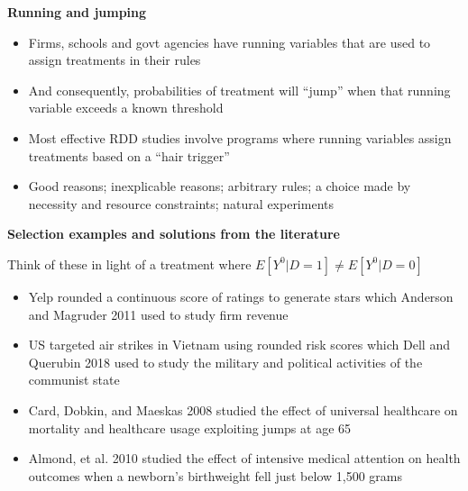 \documentclass[notes=show]{beamer}
\begin{document}
\begin{frame}[plain]
	\begin{center}
	\textbf{Running and jumping}
	\end{center}
	
	\begin{itemize}
	\item Firms, schools and govt agencies have running variables that are used to assign treatments in their rules
	\item And consequently, probabilities of treatment will ``jump'' when that running variable exceeds a known threshold
	\item  Most effective RDD studies involve programs where running variables assign treatments based on a ``hair trigger''  
	\item Good reasons; inexplicable reasons; arbitrary rules; a choice made by necessity and resource constraints; natural experiments
	\end{itemize}
\end{frame}

	



\begin{frame}[plain]
\begin{center}
\textbf{Selection examples and solutions from the literature}
\end{center}

Think of these in light of a treatment where $E[Y^0 | D=1] \neq E[Y^0 | D=0]$
		\begin{itemize}
		\item Yelp rounded a continuous score of ratings to generate stars which Anderson and Magruder 2011 used to study firm revenue
		\item US targeted air strikes in Vietnam using rounded risk scores which Dell and Querubin 2018 used to study the military and political activities of the communist state
		\item Card, Dobkin, and Maeskas 2008 studied the effect of universal healthcare on mortality and healthcare usage exploiting jumps at age 65
		\item Almond, et al. 2010 studied the effect of intensive medical attention on health outcomes when a newborn's birthweight fell just below 1,500 grams 
		\end{itemize}

\end{frame}
\end{document}

